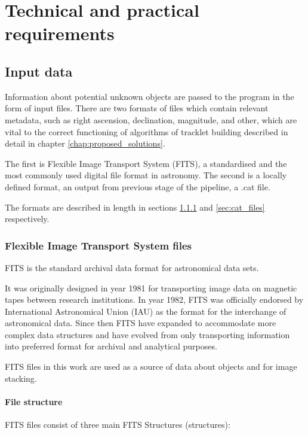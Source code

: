 \chapter{Technical and practical requirements}\label{chap:requirements}


\section{Input data}\label{sec:input_data}

	Information about potential unknown objects are passed to the program in the form of input files. There are two formats of files which contain relevant metadata, such as right ascension, declination, magnitude, and other, which are vital to the correct functioning of algorithms of tracklet building described in detail in chapter \ref{chap:proposed_solutions}. 
	
	The first is Flexible Image Transport System (FITS), a standardised and the most commonly used digital file format in astronomy. The second is a locally defined format, an output from previous stage of the pipeline, a .cat file. 
	
	The formats are described in length in sections \ref{sec:fits_files} and \ref{sec:cat_files} respectively.
\subsection{Flexible Image Transport System files}\label{sec:fits_files}
	
	FITS is the standard archival data format for astronomical data sets. 
	
	It was originally designed in year 1981 for transporting image data on magnetic tapes between research institutions. In year 1982, FITS was officially endorsed by International Astronomical Union (IAU) as the format for the interchange of astronomical data. Since then FITS have expanded to accommodate more complex data structures and have evolved from only transporting information into preferred format for archival and analytical purposes.
	
	FITS files in this work are used as a source of data about objects and for image stacking.
	
\subsubsection{File structure}

	FITS files consist of three main FITS Structures (structures):
	
